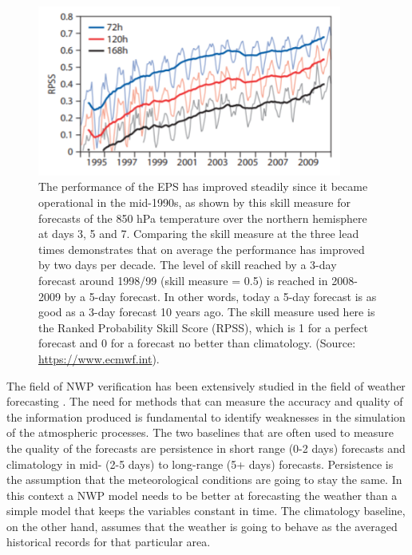 \medskip

\begin{figure}[h]
 \centerline{\includegraphics[width=10cm]{model_skill.png}} \caption{The performance of the EPS has improved steadily since it became operational in the mid-1990s, as shown by this skill measure for forecasts of the 850 hPa temperature over the northern hemisphere at days 3, 5 and 7. Comparing the skill measure at the three lead times demonstrates that on average the performance has improved by two days per decade. The level of skill reached by a 3-day forecast around 1998/99 (skill measure = 0.5) is reached in 2008-2009 by a 5-day forecast. In other words, today a 5-day forecast is as good as a 3-day forecast 10 years ago. The skill measure used here is the Ranked Probability Skill Score (RPSS), which is 1 for a perfect forecast and 0 for a forecast no better than climatology. (Source: \url{https://www.ecmwf.int}).}\label{model_improvement}
\end{figure}

The field of NWP verification has been extensively studied in the field of weather forecasting \citep{ahijevych2009application}. The need for methods that can measure the accuracy and quality of the information produced is fundamental to identify weaknesses in the simulation of the atmospheric processes. The two baselines that are often used to measure the quality of the forecasts are persistence in short range (0-2 days) forecasts and climatology in mid- (2-5 days) to long-range (5+ days) forecasts. Persistence is the assumption that the meteorological conditions are going to stay the same. In this context a NWP model needs to be better at forecasting the weather than a simple model that keeps the variables constant in time. The climatology baseline, on the other hand, assumes that the weather is going to behave as the averaged historical records for that particular area.

\medskip

